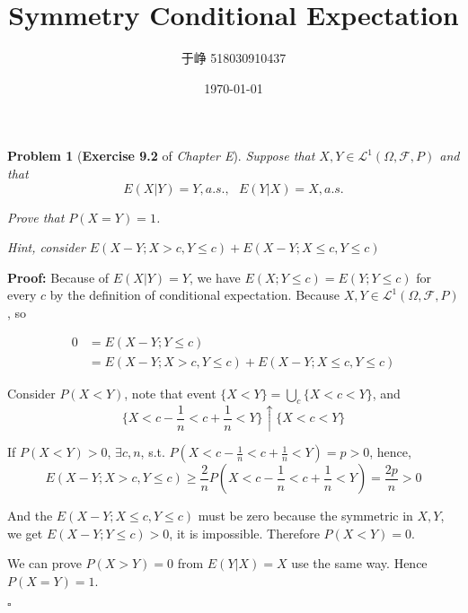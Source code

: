 \documentclass[UTF8, 12pt]{article}
\title{Symmetry Conditional Expectation}
\author{于峥 518030910437}
\date{\today}
\newenvironment{proof}{\noindent\ignorespaces\textbf{Proof:}}{\hfill $\square$\par\noindent}
\theoremstyle{break}
\newtheorem{problem}{Problem}
\begin{document}
    \maketitle
    
    \begin{problem}[\textbf{Exercise 9.2} of \textit{Chapter E}]
        Suppose that $X, Y \in \mathcal{L}^1(\Omega, \mathcal{F}, P)$ and that
        $$
        E(X|Y) =Y ,a.s., ~~~ E(Y|X) =X ,a.s.
        $$
        
        Prove that $P(X=Y)=1$.

        Hint, consider $E(X-Y; X > c, Y \leq c) + E(X - Y; X \leq c, Y \leq c)$
    \end{problem}

    \begin{proof}
        Because of $E(X|Y)=Y$, we have $E(X ; Y \leq c) = E(Y; Y \leq c)$ for every $c$
        by the definition of conditional expectation. Because $X, Y \in \mathcal{L}^1(\Omega, \mathcal{F}, P)$, so
        
        \begin{align*}
            0 
            &= E(X - Y; Y \leq c) \\
            &=E(X-Y; X > c, Y \leq c) + E(X - Y; X \leq c, Y \leq c)
        \end{align*}

        Consider $P(X < Y)$, note that event $\{ X < Y \} = \bigcup_{c} \{ X < c < Y\}$, and
            $$
            \{ X  < c - \frac 1 n < c + \frac 1 n < Y\} \uparrow \{ X < c < Y \}
            $$

        If $P(X < Y) > 0$, $\exists c, n$, s.t.
            $P(X  < c - \frac 1 n < c + \frac 1 n < Y) = p > 0$, hence, 
            $$
            E(X-Y; X > c, Y \leq c) \geq \frac 2 n P(X  < c - \frac 1 n < c + \frac 1 n < Y) = \frac {2p} {n} > 0
            $$

        And the $E(X - Y; X \leq c, Y \leq c)$ must be zero because the symmetric in $X, Y$,
        we get $E(X - Y; Y \leq c) > 0$, it is impossible. Therefore $P(X < Y) = 0$.

        We can prove $P(X > Y) = 0$ from $E(Y|X)=X$ use the same way. Hence
        $P(X=Y)=1$.





    \end{proof}
\end{document}
